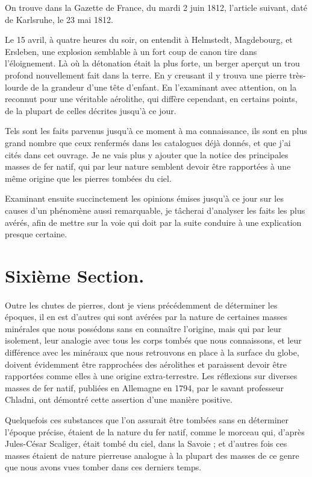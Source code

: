 \documentclass[a4paper, 12pt, oneside, french]{article}
\begin{document}
On trouve dans la Gazette de France, du mardi 2 juin 1812, l'article suivant, daté de Karlsruhe, le 23 mai 1812.

\og Le 15 avril, à quatre heures du soir, on entendit à Helmstedt, Magdebourg, et Ersleben, une explosion semblable à un fort coup de canon tire dans l'éloignement. Là où la détonation était la plus forte, un berger aperçut un trou profond nouvellement fait dans la terre. En y creusant il y trouva une pierre très-lourde de la grandeur d'une tête d'enfant. En l'examinant avec attention, on la reconnut pour une véritable aérolithe, qui diffère cependant, en certains points, de la plupart de celles décrites jusqu'à ce jour. \fg

Tels sont les faits parvenus jusqu'à ce moment à ma connaissance, ils sont en plus grand nombre que ceux renfermés dans les catalogues déjà donnés, et que j'ai cités dans cet ouvrage. Je ne vais plus y ajouter que la notice des principales masses de fer natif, qui par leur nature semblent devoir être rapportées à une même origine que les pierres tombées du ciel.

Examinant ensuite succinctement les opinions émises jusqu'à ce jour sur les causes d'un phénomène aussi remarquable, je tâcherai d'analyser les faits les plus avérés, afin de mettre sur la voie qui doit par la suite conduire à une explication presque certaine.
\clearpage
\section{Sixième Section.}
\paragraph{}
Outre les chutes de pierres, dont je viens précédemment de déterminer les époques, il en est d'autres qui sont avérées par la nature de certaines masses minérales que nous possédons sans en connaître l'origine, mais qui par leur isolement, leur analogie avec tous les corps tombés que nous connaissons, et leur différence avec les minéraux que nous retrouvons en place à la surface du globe, doivent évidemment être rapprochées des aérolithes et paraissent devoir être rapportées comme elles à une origine extra-terrestre. Les réflexions sur diverses masses de fer natif, publiées en Allemagne en 1794, par le savant professeur Chladni, ont démontré cette assertion d'une manière positive.

Quelquefois ces substances que l'on assurait être tombées sans en déterminer l'époque précise, étaient de la nature du fer natif, comme le morceau qui, d'après Jules-César Scaliger, était tombé du ciel, dans la Savoie ; et d'autres fois ces masses étaient de nature pierreuse analogue à la plupart des masses de ce genre que nous avons vues tomber dans ces derniers temps.
\end{document}
